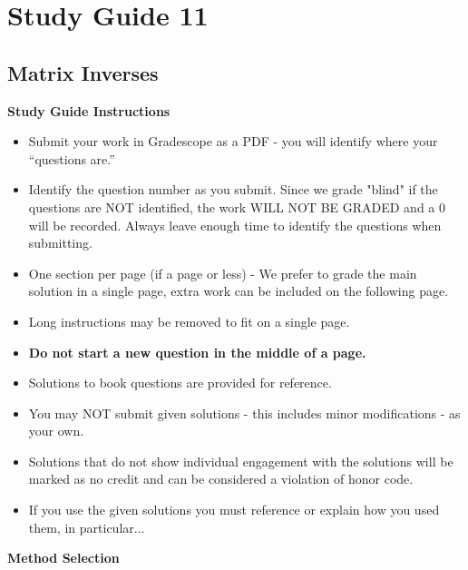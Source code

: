 \clearpage
\chapter{Study Guide 11}

\section{Matrix Inverses}

\begin{center}
    \large{\textbf{Study Guide Instructions}}
\end{center}


\begin{itemize}
    \item Submit your work in Gradescope as a PDF - you will identify where your “questions are.”
    \item Identify the question number as you submit.  Since we grade "blind" if the questions are NOT identified, the work WILL NOT BE GRADED and a 0 will be recorded. Always leave enough time to 
    identify the questions when submitting.
    \item One section per page (if a page or less) - We prefer to grade the main solution in a single page, extra work can be included on the following page.
    \item Long instructions may be removed to fit on a single page.
    \item \textbf{Do not start a new question in the middle of a page.}
    \item Solutions to book questions are provided for reference.
    \item You may NOT submit given solutions - this includes minor modifications - as your own.
    \item Solutions that do not show individual engagement with the solutions will be marked as no credit and can be considered a violation of honor code.
    \item If you use the given solutions you must reference or explain how you used them, in particular...
\end{itemize}


\begin{center}
    \large{\textbf{Method Selection}}
\end{center}


